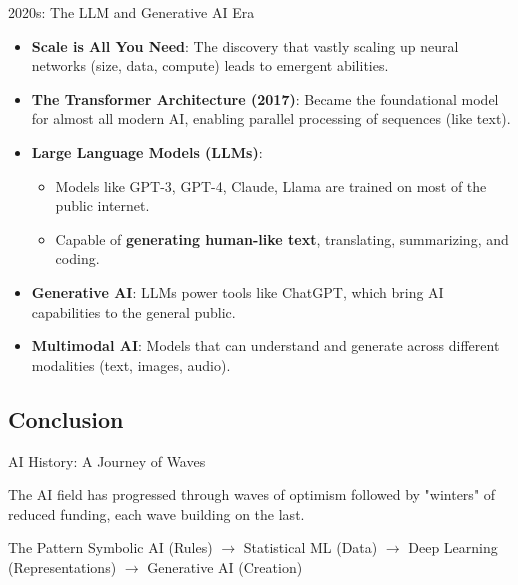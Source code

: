\documentclass{beamer}
\begin{document}
\begin{frame}[t]{2020s: The LLM and Generative AI Era}
\begin{itemize}
    \item \textbf{Scale is All You Need}: The discovery that vastly scaling up neural networks (size, data, compute) leads to emergent abilities.
    \item \textbf{The Transformer Architecture (2017)}: Became the foundational model for almost all modern AI, enabling parallel processing of sequences (like text).
    \item \textbf{Large Language Models (LLMs)}:
        \begin{itemize}
            \item Models like GPT-3, GPT-4, Claude, Llama are trained on most of the public internet.
            \item Capable of \textbf{generating human-like text}, translating, summarizing, and coding.
        \end{itemize}
    \item \textbf{Generative AI}: LLMs power tools like ChatGPT, which bring AI capabilities to the general public.
    \item \textbf{Multimodal AI}: Models that can understand and generate across different modalities (text, images, audio).
\end{itemize}
\begin{center}
\end{center}
\end{frame}

\subsection{Conclusion}

\begin{frame}[t]{AI History: A Journey of Waves}
\begin{center}
    \scriptsize{The AI field has progressed through waves of optimism followed by "winters" of reduced funding, each wave building on the last.}
\end{center}
\begin{block}{The Pattern}
Symbolic AI (Rules) $\rightarrow$ Statistical ML (Data) $\rightarrow$ Deep Learning (Representations) $\rightarrow$ Generative AI (Creation)
\end{block}
\end{frame}
\end{document}
